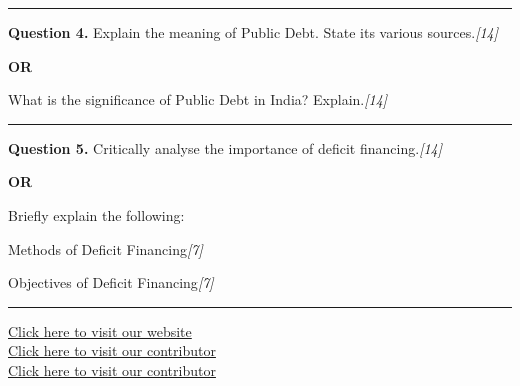 \documentclass[11pt,a4paper]{article}
\newcommand{\pts}[1]{\hfill   \textit{[#1]}}
\begin{document}
\medskip\rule{\linewidth}{0.2pt}




\noindent   \textbf{Question 4.}
Explain the meaning of Public Debt. State its various sources.\pts{14}

\centerline{   \textbf{OR}}

What is the significance of Public Debt in India? Explain.\pts{14}

\medskip\rule{\linewidth}{0.2pt}




\noindent   \textbf{Question 5.}
Critically analyse the importance of deficit financing.\pts{14}

\centerline{   \textbf{OR}}

Briefly explain the following:

\begin{parts}
  \item Methods of Deficit Financing\pts{7}
  \item Objectives of Deficit Financing\pts{7}
\end{parts}

\vfill
\rule{\linewidth}{0.4pt}

\begin{center}\small
\href{https://bhu-exam.vercel.app/}{Click here to visit our website}\\[4pt]
\href{https://me-aryan.vercel.app/}{Click here to visit our contributor}\\[4pt]
\href{https://quashan-me.vercel.app/}{Click here to visit our contributor}
\end{center}
\end{document}
